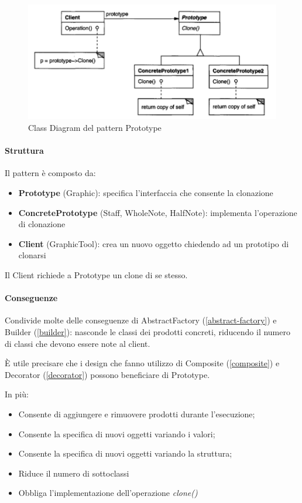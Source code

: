 \begin{figure}[H]
    \centering
    \includegraphics[width=0.75\linewidth]{assets/pattern/prototype/prototype-struttura.png}
    \caption{Class Diagram del pattern Prototype}
\end{figure}

\paragraph{Struttura} Il pattern è composto da:
\begin{itemize}
    \item \textbf{Prototype} (Graphic): specifica l'interfaccia che consente la clonazione
    \item \textbf{ConcretePrototype} (Staff, WholeNote, HalfNote): implementa l'operazione di clonazione
    \item \textbf{Client} (GraphicTool): crea un nuovo oggetto chiedendo ad un prototipo di clonarsi
\end{itemize}

Il Client richiede a Prototype un clone di se stesso.


\paragraph{Conseguenze} Condivide molte delle conseguenze di AbstractFactory (\ref{abstract-factory}) e Builder (\ref{builder}): nasconde le classi dei prodotti concreti, riducendo il numero di classi che devono essere note al client. 

È utile precisare che i design che fanno utilizzo di Composite (\ref{composite}) e Decorator (\ref{decorator}) possono beneficiare di Prototype.

In più:
\begin{itemize}
    \item Consente di aggiungere e rimuovere prodotti durante l’esecuzione;
    \item Consente la specifica di nuovi oggetti variando i valori;
    \item Consente la specifica di nuovi oggetti variando la struttura;
    \item Riduce il numero di sottoclassi
    \item Obbliga l'implementazione dell’operazione \textit{clone()}
\end{itemize}

